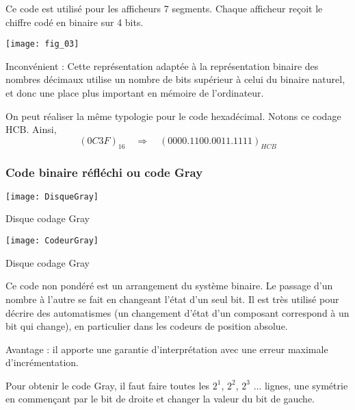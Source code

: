 Ce code est utilisé pour les afficheurs 7 segments. Chaque afficheur reçoit le chiffre codé en binaire sur 4 bits. 


\begin{marginfigure}
\texttt{[image: fig\_03]}
\end{marginfigure}
Inconvénient : Cette représentation adaptée à la représentation binaire des nombres décimaux utilise un nombre de bits supérieur à celui du binaire naturel, et donc une place plus important en mémoire de l'ordinateur. 



\begin{rem}
On peut réaliser la même typologie pour le code hexadécimal. Notons ce codage HCB. Ainsi,
$$
(0C3F)_{16} \quad \Longrightarrow \quad (0000.1100.0011.1111)_{HCB}
$$
\end{rem}

\clearpage

\subsubsection{Code  binaire réfléchi ou code Gray}


\begin{marginfigure}
\texttt{[image: DisqueGray]} 
\caption{Disque codage Gray}
\end{marginfigure}

\begin{marginfigure}
\texttt{[image: CodeurGray]} 
\caption{Disque codage Gray}
\end{marginfigure}

Ce code non pondéré est un arrangement du système binaire. Le passage d'un nombre à l'autre se fait en changeant l'état d'un seul bit. Il est très utilisé pour décrire des automatismes (un changement d'état d'un composant correspond à un bit qui change), en particulier dans les codeurs de position absolue. 

Avantage : il apporte une garantie d'interprétation avec une erreur maximale d'incrémentation. 
%
%
%




Pour obtenir le code Gray, il faut faire toutes les $2^1$, $2^2$, $2^3$ ... lignes, une symétrie en commençant par le bit de droite et changer la valeur du bit de gauche. 


